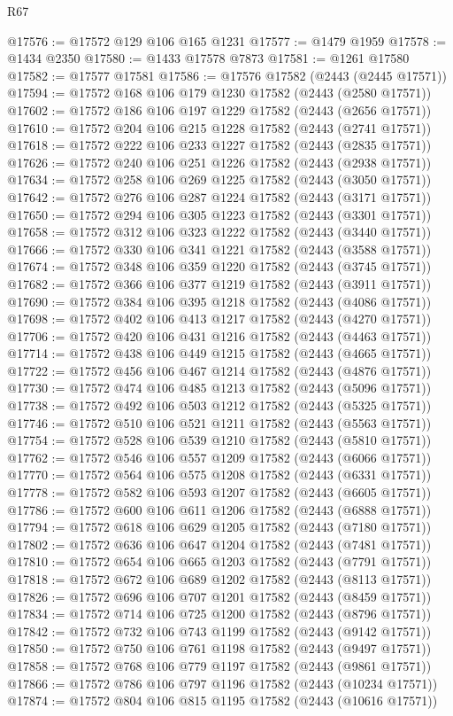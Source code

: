 \begin{lexlean}{R67}
\begin{coremodule}
@17576 := @17572 @129 @106 @165 @1231
@17577 := @1479 @1959
@17578 := @1434 @2350
@17580 := @1433 @17578 @7873
@17581 := @1261 @17580
@17582 := @17577 @17581
@17586 := @17576 @17582 (@2443 (@2445 @17571))
@17594 := @17572 @168 @106 @179 @1230 @17582 (@2443 (@2580 @17571))
@17602 := @17572 @186 @106 @197 @1229 @17582 (@2443 (@2656 @17571))
@17610 := @17572 @204 @106 @215 @1228 @17582 (@2443 (@2741 @17571))
@17618 := @17572 @222 @106 @233 @1227 @17582 (@2443 (@2835 @17571))
@17626 := @17572 @240 @106 @251 @1226 @17582 (@2443 (@2938 @17571))
@17634 := @17572 @258 @106 @269 @1225 @17582 (@2443 (@3050 @17571))
@17642 := @17572 @276 @106 @287 @1224 @17582 (@2443 (@3171 @17571))
@17650 := @17572 @294 @106 @305 @1223 @17582 (@2443 (@3301 @17571))
@17658 := @17572 @312 @106 @323 @1222 @17582 (@2443 (@3440 @17571))
@17666 := @17572 @330 @106 @341 @1221 @17582 (@2443 (@3588 @17571))
@17674 := @17572 @348 @106 @359 @1220 @17582 (@2443 (@3745 @17571))
@17682 := @17572 @366 @106 @377 @1219 @17582 (@2443 (@3911 @17571))
@17690 := @17572 @384 @106 @395 @1218 @17582 (@2443 (@4086 @17571))
@17698 := @17572 @402 @106 @413 @1217 @17582 (@2443 (@4270 @17571))
@17706 := @17572 @420 @106 @431 @1216 @17582 (@2443 (@4463 @17571))
@17714 := @17572 @438 @106 @449 @1215 @17582 (@2443 (@4665 @17571))
@17722 := @17572 @456 @106 @467 @1214 @17582 (@2443 (@4876 @17571))
@17730 := @17572 @474 @106 @485 @1213 @17582 (@2443 (@5096 @17571))
@17738 := @17572 @492 @106 @503 @1212 @17582 (@2443 (@5325 @17571))
@17746 := @17572 @510 @106 @521 @1211 @17582 (@2443 (@5563 @17571))
@17754 := @17572 @528 @106 @539 @1210 @17582 (@2443 (@5810 @17571))
@17762 := @17572 @546 @106 @557 @1209 @17582 (@2443 (@6066 @17571))
@17770 := @17572 @564 @106 @575 @1208 @17582 (@2443 (@6331 @17571))
@17778 := @17572 @582 @106 @593 @1207 @17582 (@2443 (@6605 @17571))
@17786 := @17572 @600 @106 @611 @1206 @17582 (@2443 (@6888 @17571))
@17794 := @17572 @618 @106 @629 @1205 @17582 (@2443 (@7180 @17571))
@17802 := @17572 @636 @106 @647 @1204 @17582 (@2443 (@7481 @17571))
@17810 := @17572 @654 @106 @665 @1203 @17582 (@2443 (@7791 @17571))
@17818 := @17572 @672 @106 @689 @1202 @17582 (@2443 (@8113 @17571))
@17826 := @17572 @696 @106 @707 @1201 @17582 (@2443 (@8459 @17571))
@17834 := @17572 @714 @106 @725 @1200 @17582 (@2443 (@8796 @17571))
@17842 := @17572 @732 @106 @743 @1199 @17582 (@2443 (@9142 @17571))
@17850 := @17572 @750 @106 @761 @1198 @17582 (@2443 (@9497 @17571))
@17858 := @17572 @768 @106 @779 @1197 @17582 (@2443 (@9861 @17571))
@17866 := @17572 @786 @106 @797 @1196 @17582 (@2443 (@10234 @17571))
@17874 := @17572 @804 @106 @815 @1195 @17582 (@2443 (@10616 @17571))

\end{coremodule}
\end{lexlean}

